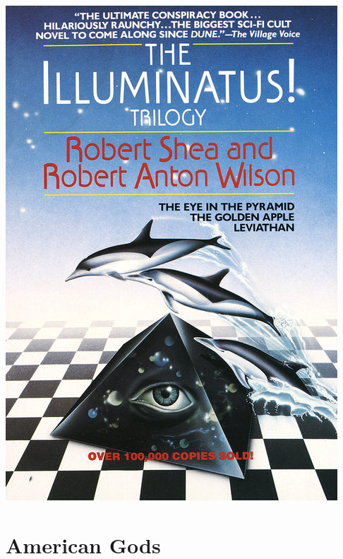 \documentclass{tufte-handout}
\makeatletter
\newcommand{\varcaption}[2][0pt]{%
  \gsetlength{\@tufte@caption@vertical@offset}{-#1}%
  \gdef\@tufte@stored@varcaption{#2}%
}
\gdef\@tufte@stored@varcaption{} %
\makeatother
\begin{document}
\begin{marginfigure}[-43\baselineskip]
   \includegraphics[width=\linewidth]{images/illuminatus.jpg}
   \varcaption{\href{https://www.penguinrandomhouse.com/books/165363/the-illuminatus-trilogy-by-robert-shea-and-robert-anton-wilson/}{Publisher Link}, \href{https://www.amazon.com/Illuminatus-Trilogy-Pyramid-Golden-Leviathan/dp/0440539811}{Amazon Link}}
\end{marginfigure}

\section*{American Gods}
\end{document}
